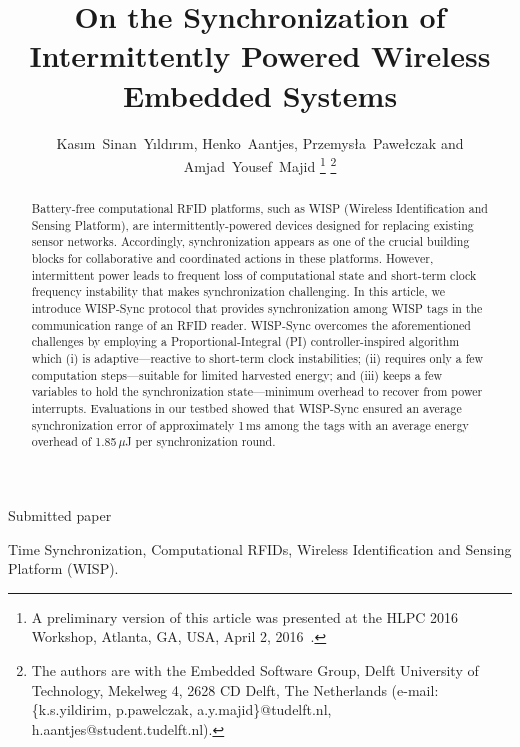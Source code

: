 \documentclass[journal,draftcls,onecolumn,12pt,twoside]{IEEEtranTCOM}
\begin{document}
\title{On the Synchronization of Intermittently Powered Wireless Embedded Systems}

\author{Kas{\i}m~Sinan~Y{\i}ld{\i}r{\i}m, Henko~Aantjes, Przemys{\l}a~Pawe{\l}czak and Amjad~Yousef~Majid
%
\thanks{A preliminary version of this article was presented at the HLPC 2016 Workshop, Atlanta, GA, USA, April 2, 2016~\cite{hlpc2016}.}%
\thanks{The authors are with the Embedded Software Group, Delft University of Technology, Mekelweg 4, 2628 CD Delft, The Netherlands (e-mail: \{k.s.yildirim, p.pawelczak, a.y.majid\}@tudelft.nl, h.aantjes@student.tudelft.nl).}}

%
{Submitted paper}

\maketitle


\begin{abstract}
Battery-free computational RFID platforms, such as WISP (Wireless Identification and Sensing Platform), are intermittently-powered devices designed for replacing existing sensor networks. Accordingly, synchronization appears as one of the  crucial building blocks for collaborative and coordinated actions in these platforms. However, intermittent power leads to frequent loss of computational state and short-term clock frequency instability that makes synchronization challenging. In this article, we introduce WISP-Sync protocol that provides synchronization among WISP tags in the communication range of an RFID reader. WISP-Sync overcomes the aforementioned challenges by employing a Proportional-Integral (PI) controller-inspired algorithm which (i) is adaptive---reactive to short-term clock instabilities; (ii) requires only a few computation steps---suitable for limited harvested energy; and (iii) keeps a few variables to hold the synchronization state---minimum overhead to recover from power interrupts.	Evaluations in our testbed showed that WISP-Sync ensured an average synchronization error of approximately 1\,ms among the tags with an average energy overhead of 1.85\,$\mu$J per synchronization round.
\end{abstract}
%
\begin{IEEEkeywords}Time Synchronization, Computational RFIDs, Wireless Identification and Sensing Platform (WISP).
\end{IEEEkeywords}

\IEEEpeerreviewmaketitle
\end{document}
